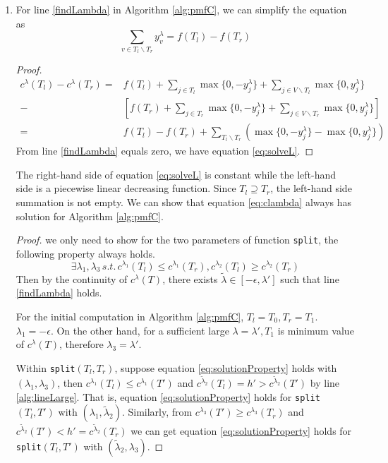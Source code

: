 \documentclass{article}
\begin{document}
\begin{enumerate}
\item For line \ref{findLambda} in  Algorithm \ref{alg:pmfC}, we can simplify the equation as
\begin{equation}\label{eq:solveL}
	\sum_{v\in T_l \backslash T_r} y^{\lambda}_v  = f(T_l)-f(T_r)
\end{equation}
\begin{proof}
	\begin{align*}
	c^{\lambda}(T_l) -
	c^{\lambda}(T_r)  =& f(T_l) + \sum_{j \in T_l} \max\{0, -y^{\lambda}_j\} + \sum_{j \in V\backslash T_l} \max\{0, y^{\lambda}_j\} \\
	-& [f(T_r) + \sum_{j \in T_r} \max\{0, -y^{\lambda}_j\} + \sum_{j \in V\backslash T_r} \max\{0, y^{\lambda}_j\}] \\
	= & f(T_l) - f(T_r) + \sum_{T_l \backslash T_r} (\max\{0, -y^{\lambda}_j\} - \max\{0, y^{\lambda}_j\} )
	\end{align*}
	From line \ref{findLambda} equals zero, we have equation \eqref{eq:solveL}.
\end{proof}
The right-hand side of equation \eqref{eq:solveL} is constant while the left-hand side is a piecewise linear decreasing function. Since $T_l \supseteq T_r$, the left-hand side summation is not empty. We can show that equation \eqref{eq:clambda} always has solution for Algorithm \ref{alg:pmfC}.
\begin{proof}
	we only need to show for the two parameters of function \texttt{split}, the following property always holds.
\begin{equation}\label{eq:solutionProperty}
\exists \lambda_1, \lambda_3 \,s.t.\, c^{\lambda_1}(T_l) \leq c^{\lambda_1}(T_r), c^{\lambda_2}(T_l) \geq c^{\lambda_2}(T_r)
\end{equation}
Then by the continuity of $c^{\lambda}(T)$, there exists $\tilde{\lambda} \in [-\epsilon, \lambda']$ such that line \eqref{findLambda} holds.

For the initial computation in Algorithm \ref{alg:pmfC},
	$T_l = T_0, T_r = T_1$. $\lambda_1 = -\epsilon$. On the other hand, for a sufficient large $\lambda=\lambda', T_1$ is minimum value of $c^{\lambda}(T)$, therefore $\lambda_3 = \lambda'$. 

Within \texttt{split}$(T_l, T_r)$, suppose equation \eqref{eq:solutionProperty} holds with $(\lambda_1, \lambda_3)$, then 
$c^{\lambda_1}(T_l) \leq c^{\lambda_1}(T')$ and $c^{\tilde{\lambda}_2}(T_l) = h' > c^{\tilde{\lambda}_2}(T')$ by line \ref{alg:lineLarge}. That is, equation \eqref{eq:solutionProperty} holds for \texttt{split}$(T_l, T')$ with $(\lambda_1, \tilde{\lambda}_2)$. Similarly, from $c^{\lambda_3}(T') \geq c^{\lambda_3}(T_r)$ and $c^{\tilde{\lambda}_2}(T') < h' = c^{\tilde{\lambda}_2}(T_r)$ we can get  equation \eqref{eq:solutionProperty} holds for \texttt{split}$(T_l, T')$ with $(\tilde{\lambda}_2, \lambda_3)$.


\end{proof}
\end{enumerate}
\end{document}
